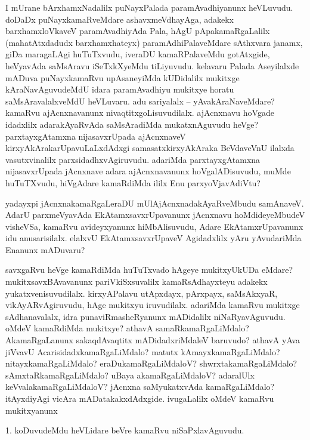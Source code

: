\begin{artha}
I mUrane bArxhamxNadalilx puNayxPalada paramAvadhiyanunx heVLuvudu. \-doDaDx puNayxkamaRveMdare ashavxmeVdhayAga, adakekx barxhamxloVkaveV paramAvadhiyAda Pala, hAgU pApakamaRgaLalilx (mahatAtxdadudx barxhamxhateyx) paramAdhiPalaveMdare sAthxvara janamx, giDa maragaLAgi huTuTxvudu, iveraDU kamaRPalaveMdu gotAtxgide, heVya\-vAda saMsAravu iSeTxkXyeMdu tiLiyuvudu. kelavaru Palada Aseyilalxde mADuva puNayxkamaRvu upAsaneyiMda kUDidalilx mukitxge kAraNavAguvudeMdU idara paramAvadhiyu mukitxye horatu saMsAravalalxveMdU heVLuvaru. adu sariyalalx -- yAvakAraNaveMdare? kamaRvu ajAcnxnavanunx nivaqtitxgoLisuvudilalx. ajAcnxnavu hoVgade idadxlilx adarakAyaRvAda saMsAradiMda mukatxnAguvudu heVge? parxtayx\-gAtamxna nijasavxrUpada ajAcnxnaveV kirxyAkArakarUpavuLaLxdAdxgi samasatxkirxyAkAraka BeVdaveVnU ilalxda vasutxvinalilx parxsidadhxvAgiruvudu. adariMda parxtayxgAtamxna nija\-savxrUpada jAcnxnave adara ajAcnxnavanunx hoVgalADisuvudu, muMde huTuTXvudu, hiVgAdare kamaRdiMda ililx Enu parxyoVjavAdiVtu?

yadayxpi jAcnxnakamaRgaLeraDU mUlAjAcnxnadakAyaRveMbudu  samAnaveV. AdarU parxmeVyavAda EkAtamxsavxrUpavanunx jAcnxnavu hoMdideyeMbudeV visheVSa, kamaRvu avideyxyanunx hiMbAlisuvudu, Adare EkAtamxrUpavanunx idu anusarisilalx. elalxvU EkAtamxsavxrUpaveV Agidadxlilx yAru yAvudariMda Enanunx mADuvaru?
\end{artha}

\centerline{}

\begin{artha}
savxgaRvu heVge kamaRdiMda huTuTxvado hAgeye mukitxyUkUDa eMdare? mukitxsavxBAvavanunx pariVkiSxsuvalilx kamaRsAdhayxteyu adakekx yukatxvenisuvudilalx. \-kirxyAPalavu utApxdayx, pArxpayx, saMsAkxyaR, vikAyARvAgiruvudu, hAge mukitx\-yu iruvudilalx. adariMda kamaRvu mukitxge sAdhanavalalx, idra punaviRmasheR\-yanunx mADidalilx niNaRyavAguvudu. oMdeV kamaRdiMda mukitxye? athavA samaRkamaRgaLiMdalo? AkamaRgaLanunx sakaqdAvaqtitx mADidadxriMdaleV \break baruvudo? athavA yAva jiVvavU AcarisidadxkamaRgaLiMdalo? matutx kAmayx\-kamaRgaLiMdalo? nitayxkamaRgaLiMdalo? eraDukamaRgaLiMdaloV? shwrxta\-kamaRgaLiMdalo? sAmxtaRkamaRgaLiMdalo? uBaya akamaRgaLiMdaloV? adaralUlx keVvalakamaRgaLiMdaloV? jAcnxna saMyukatxvAda kamaRgaLiMdalo? itAyxdiyAgi vicAra mADatakakxdAdxgide. ivugaLalilx oMdeV kamaRvu mukitxyanunx 
\end{artha}

\begin{artha}
1. koDuvudeMdu heVLidare beVre kamaRvu niSaPxlavAguvudu.
\end{artha}

